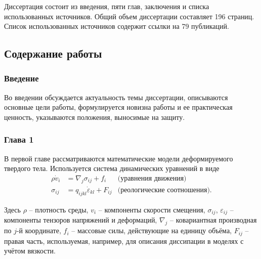 Диссертация состоит из введения, пяти глав, заключения и списка использованных источников. Общий объем диссертации составляет 196 страниц. Список использованных источников содержит ссылки на 79 публикаций.

\clearpage
\newpage

\subsection*{Содержание работы}



\subsubsection*{Введение}

Во введении обсуждается актуальность темы диссертации, описываются основные цели работы, формулируется новизна работы и ее практическая ценность, указываются положения, выносимые на защиту.

\subsubsection*{Глава 1}

В первой главе рассматриваются математические модели деформируемого твердого тела. Используется система динамических уравнений в виде
\begin{align}
\label{initial_equations}
\rho\dot{v}_i &= \nabla_j\sigma_{ij}+f_i & \textrm{(уравнения движения)}\nonumber\\
\sigma_{ij} &= q_{ijkl}\dot{\varepsilon}_{kl}+F_{ij} & \textrm{(реологические
соотношения).}
\end{align}

Здесь $\rho$ – плотность среды, $v_i$ – компоненты скорости смещения,
$\sigma_{ij}$, $\varepsilon_{ij}$ -- компоненты тензоров напряжений и деформаций,
$\nabla_j$ – ковариантная производная по $j$-й координате, $f_i$ – массовые
силы, действующие на единицу объёма, $F_{ij}$ -- правая часть, используемая, например, для описания диссипации в моделях с учётом вязкости.

